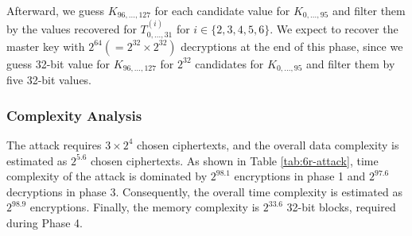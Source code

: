 \documentclass[a4paper]{llncs}
\begin{document}
Afterward, we guess $K_{96,...,127}$ for each candidate value for $K_{0,...,95}$ and filter them by the values recovered for $T^{(i)}_{0,...,31}$ for $i\in \{2,3,4,5,6\}$. We expect to recover the master key with $2^{64}(=2^{32} \times 2^{32})$ decryptions at the end of this phase, since we guess 32-bit value for $K_{96,...,127}$ for $2^{32}$ candidates for $K_{0,...,95}$ and filter them by five 32-bit values.

\subsubsection{Complexity Analysis}
The attack requires $3\times 2^{4}$ chosen ciphertexts, and the overall data complexity is estimated as $2^{5.6}$ chosen ciphertexts. As shown in Table \ref{tab:6r-attack}, time complexity of the attack is dominated by $2^{98.1}$ encryptions in  phase 1 and $2^{97.6}$ decryptions in  phase 3. Consequently, the overall time complexity is estimated as $2^{98.9}$ encryptions. Finally, the memory complexity is $2^{33.6}$ 32-bit blocks, required during Phase 4.

\begin{table}[t!]
\centering
\begin{center}
\caption{Summary of the key recovery attack on 6-round CHILOW-(32+$\tau$)}
\label{tab:6r-attack}
\renewcommand{\arraystretch}{1.5}
\end{center}
\end{table}
\end{document}
